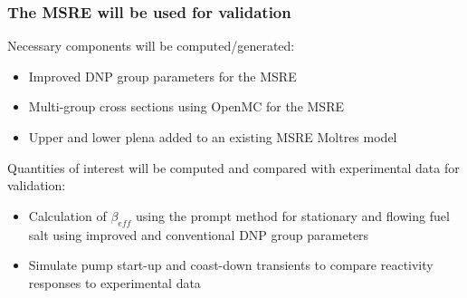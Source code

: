 \begin{frame}
  \frametitle{The MSRE will be used for validation}
    \begin{block}{Necessary components will be computed/generated:}
        \begin{itemize}
            \item Improved \gls{DNP} group parameters for the \gls{MSRE}
            \item Multi-group cross sections using OpenMC for the \gls{MSRE}
            \item Upper and lower plena added to an existing \gls{MSRE} Moltres model
        \end{itemize}
    \end{block}
    \begin{block}{Quantities of interest will be computed and compared with experimental data for validation:}
      \begin{itemize}
          \item Calculation of $\beta_{eff}$ using the prompt method for stationary and flowing fuel salt using improved and conventional \gls{DNP} group parameters \cite{haubenreich1970experience}
          \item Simulate pump start-up and coast-down transients to compare reactivity responses to experimental data \cite{prince1968zero}
      \end{itemize}
    \end{block}
\end{frame}
